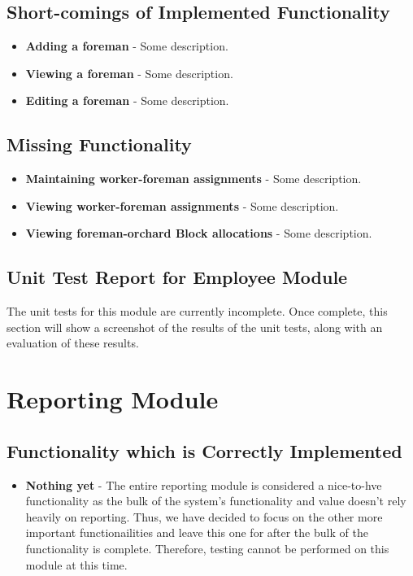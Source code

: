 \documentclass[11pt,fleqn]{book} %
\begin{document}
	\section{Short-comings of Implemented Functionality}
		\begin{itemize}
			\item\textbf{Adding a foreman} -
			Some description. 
			
			\item\textbf{Viewing a foreman} -
			Some description.
			
			\item\textbf{Editing a foreman} -
			Some description.
		\end{itemize}
	\section{Missing Functionality}
		\begin{itemize}
			\item\textbf{Maintaining worker-foreman assignments} -
			Some description.
			
			\item\textbf{Viewing worker-foreman assignments} -
			Some description.
			
			\item\textbf{Viewing foreman-orchard Block allocations} -
			Some description.
		\end{itemize}
	\section{Unit Test Report for Employee Module}
		The unit tests for this module are currently incomplete. Once complete, this section will show a screenshot of the results of the unit tests, along with an evaluation of these results.



\chapter{Reporting Module}
	\section{Functionality which is Correctly Implemented}
		\begin{itemize}
			\item\textbf{Nothing yet} -
			The entire reporting module is considered a nice-to-hve functionality as the bulk of the system's functionality and value doesn't rely heavily on reporting. Thus, we have decided to focus on the other more important functionailities and leave this one for after the bulk of the functionality is complete. Therefore, testing cannot be performed on this module at this time.
		\end{itemize}
\end{document}
